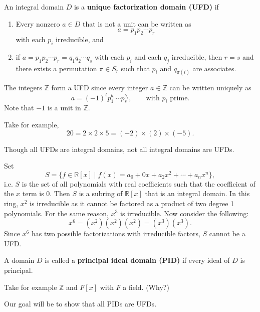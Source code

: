 \begin{definition}
	An integral domain $D$ is a \textbf{unique factorization domain (UFD)} if
	\begin{enumerate}
		\item Every nonzero $a\in D$ that is not a unit can be written as
		$$a=p_1p_2\cdots p_r$$
		with each $p_i$ irreducible, and
		\item if $a=p_1p_2\cdots p_r=q_1q_2\cdots q_s$ with each $p_i$ and each $q_j$ irreducible, then $r=s$ and there exists a permutation $\pi\in S_r$ such that $p_i$ and $q_{\pi(i)}$ are associates.
	\end{enumerate}
\end{definition}

\begin{example}
	The integers $\mathbb Z$ form a UFD since every integer $a\in\mathbb Z$ can be written uniquely as
	$$a=(-1)^tp_1^{b_1}\cdots p_s^{b_s},\qquad\text{with $p_i$ prime.}$$
	Note that $-1$ is a unit in $\mathbb Z$.

	Take for example,
	$$20=2\times 2\times 5=(-2)\times(2)\times(-5).$$
\end{example}

\begin{example}
	Though all UFDs are integral domains, not all integral domains are UFDs.

	Set $$S=\{f\in\mathbb R[x]\mid f(x)=a_0+0x+a_2x^2+\cdots+a_nx^n\},$$
	i.e. $S$ is the set of all polynomials with real coefficients such that the coefficient of the $x$ term is $0$. Then $S$ is a subring of $\mathbb R[x]$ that is an integral domain. In this ring, $x^2$ is irreducible as it cannot be factored as a product of two degree 1 polynomials. For the same reason, $x^3$ is irreducible. Now consider the following:
	$$x^6=(x^2)(x^2)(x^2)=(x^3)(x^3).$$
	Since $x^6$ has two possible factorizations with irreducible factors, $S$ cannot be a UFD.
\end{example}

\begin{definition}
	A domain $D$ is called a \textbf{principal ideal domain (PID)} if every ideal of $D$ is principal.
\end{definition}

\begin{example}
	Take for example $\mathbb Z$ and $F[x]$ with $F$ a field. (Why?)
\end{example}

Our goal will be to show that all PIDs are UFDs.

